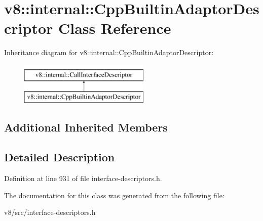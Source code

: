 \hypertarget{classv8_1_1internal_1_1CppBuiltinAdaptorDescriptor}{}\section{v8\+:\+:internal\+:\+:Cpp\+Builtin\+Adaptor\+Descriptor Class Reference}
\label{classv8_1_1internal_1_1CppBuiltinAdaptorDescriptor}
Inheritance diagram for v8\+:\+:internal\+:\+:Cpp\+Builtin\+Adaptor\+Descriptor\+:\begin{figure}[H]
\begin{center}
\leavevmode
\includegraphics[height=2.000000cm]{classv8_1_1internal_1_1CppBuiltinAdaptorDescriptor}
\end{center}
\end{figure}
\subsection*{Additional Inherited Members}


\subsection{Detailed Description}


Definition at line 931 of file interface-\/descriptors.\+h.



The documentation for this class was generated from the following file\+:\begin{DoxyCompactItemize}
\item 
v8/src/interface-\/descriptors.\+h\end{DoxyCompactItemize}
